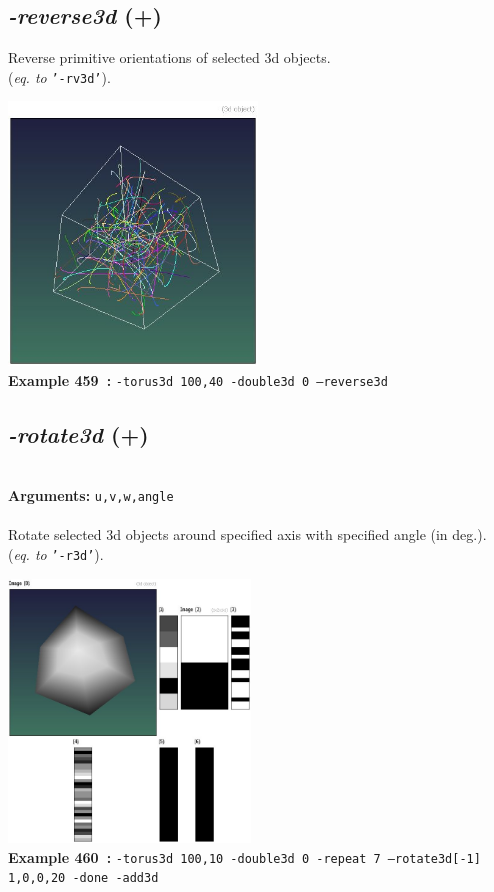 \documentclass[a4paper,11pt,twoside]{book}
\begin{document}
\subsection{\emph{-reverse3d} (+)}\vspace*{-0.5em}
Reverse primitive orientations of selected 3d objects.
~\\(\emph{eq. to} {\small \texttt{'-rv3d'}}).
\begin{center}\includegraphics[keepaspectratio=true,height=7cm,width=\textwidth]{img/gmic_def459.jpg}\\
{\footnotesize \textbf{Example 459~:} \texttt{-torus3d 100,40 -double3d 0 --reverse3d}}
\end{center}

\subsection{\emph{-rotate3d} (+)}\vspace*{-0.5em}
~\\\textbf{Arguments: } 
{\small \texttt{u,v,w,angle}}\\~\\
Rotate selected 3d objects around specified axis with specified angle (in deg.).
~\\(\emph{eq. to} {\small \texttt{'-r3d'}}).
\begin{center}\includegraphics[keepaspectratio=true,height=7cm,width=\textwidth]{img/gmic_def460.jpg}\\
{\footnotesize \textbf{Example 460~:} \texttt{-torus3d 100,10 -double3d 0 -repeat 7 --rotate3d[-1] 1,0,0,20 -done -add3d}}
\end{center}
\end{document}
